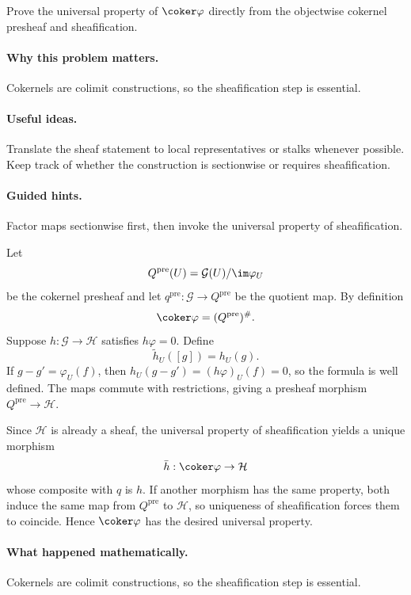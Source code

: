\begin{problem}\label{prob:vi15-p7}
Prove the universal property of $\coker\varphi$ directly from the objectwise cokernel presheaf and sheafification.
\end{problem}

\ifdefined\FullProblemDossiers
\paragraph{Why this problem matters.}
Cokernels are colimit constructions, so the sheafification step is essential.

\paragraph{Useful ideas.}
Translate the sheaf statement to local representatives or stalks whenever possible.  Keep track of whether the construction is sectionwise or requires sheafification.

\paragraph{Guided hints.}
Factor maps sectionwise first, then invoke the universal property of sheafification.

\begin{solution}
Let
\[
Q^{\mathrm{pre}}(U)=\mathcal G(U)/\im\varphi_U
\]
be the cokernel presheaf and let $q^{\mathrm{pre}}:\mathcal G\to Q^{\mathrm{pre}}$ be the quotient map. By definition
\[
\coker\varphi=(Q^{\mathrm{pre}})^\#.
\]
Suppose $h:\mathcal G\to\mathcal H$ satisfies $h\varphi=0$. Define
\[
\widetilde h_U([g])=h_U(g).
\]
If $g-g'=\varphi_U(f)$, then $h_U(g-g')=(h\varphi)_U(f)=0$, so the formula is well defined. The maps commute with restrictions, giving a presheaf morphism $Q^{\mathrm{pre}}\to\mathcal H$.

Since $\mathcal H$ is already a sheaf, the universal property of sheafification yields a unique morphism
\[
\bar h:\coker\varphi\to\mathcal H
\]
whose composite with $q$ is $h$. If another morphism has the same property, both induce the same map from $Q^{\mathrm{pre}}$ to $\mathcal H$, so uniqueness of sheafification forces them to coincide. Hence $\coker\varphi$ has the desired universal property.
\end{solution}

\paragraph{What happened mathematically.}
Cokernels are colimit constructions, so the sheafification step is essential.

